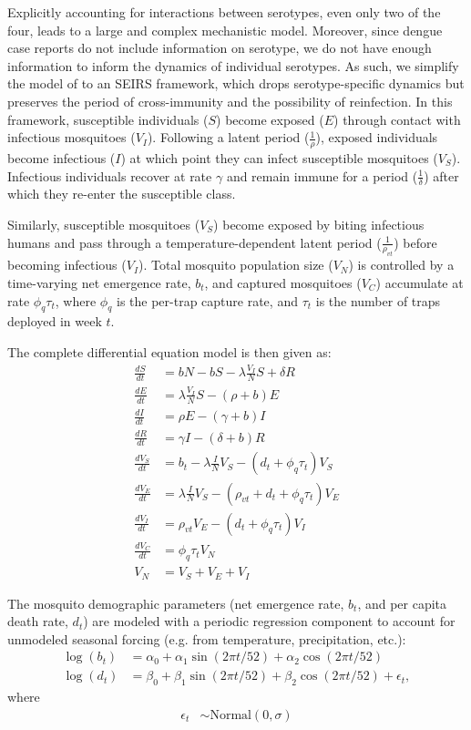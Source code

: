 \documentclass[10pt,letterpaper]{article}
\begin{document}
Explicitly accounting for interactions between serotypes, even only two of the four, leads to a large and complex mechanistic model.
Moreover, since dengue case reports do not include information on serotype, we do not have enough information to inform the dynamics of individual serotypes.
As such, we simplify the model of \cite{Wearing2006} to an SEIRS framework, which drops serotype-specific dynamics but preserves the period of cross-immunity and the possibility of reinfection.
In this framework, susceptible individuals ($S$) become exposed ($E$) through contact with infectious mosquitoes ($V_I$).
Following a latent period ($\frac{1}{\rho}$), exposed individuals become infectious ($I$) at which point they can infect susceptible mosquitoes ($V_S$).
Infectious individuals recover at rate $\gamma$ and remain immune for a period ($\frac{1}{\delta}$) after which they re-enter the susceptible class.

Similarly, susceptible mosquitoes ($V_S$) become exposed by biting infectious humans and pass through a temperature-dependent latent period ($\frac{1}{\rho_{vt}}$) before becoming infectious ($V_I$).
Total mosquito population size ($V_N$) is controlled by a time-varying net emergence rate, $b_t$, and captured mosquitoes ($V_C$) accumulate at rate $\phi_q \tau_t$, where $\phi_q$ is the per-trap capture rate, and $\tau_t$ is the number of traps deployed in week $t$.

The complete differential equation model is then given as:
\begin{align} 
\frac{dS}{dt} &= bN - bS - \lambda \frac{V_{I}}{N} S + \delta R\\
\frac{dE}{dt} &= \lambda \frac{V_{I}}{N} S - (\rho + b)E\\
\frac{dI}{dt} &= \rho E - (\gamma + b)I\\
\frac{dR}{dt} &= \gamma I - (\delta + b)R\\
\frac{dV_S}{dt} & = b_t - \lambda \frac{I}{N} V_S - (d_t + \phi_q \tau_t) V_S \\
\frac{dV_E}{dt} &= \lambda \frac{I}{N} V_S - (\rho_{vt} + d_t + \phi_q \tau_t)V_E\\
\frac{dV_I}{dt} &= \rho_{vt} V_E - (d_t + \phi_q \tau_t) V_I\\
\frac{dV_C}{dt} & = \phi_q \tau_t V_N\\
V_N &= V_S + V_E + V_I
\end{align}

The mosquito demographic parameters (net emergence rate, $b_t$, and per capita death rate, $d_t$) are modeled with a periodic regression component to account for unmodeled seasonal forcing (e.g. from temperature, precipitation, etc.):
\begin{align}
\log(b_t) & = \alpha_{0} + \alpha_1 \sin(2\pi t / 52) + \alpha_2 \cos(2\pi t / 52) \\
\log(d_{t}) & = \beta_{0} + \beta_1 \sin(2\pi t / 52) + \beta_2 \cos(2\pi t / 52) + \epsilon_t,
\end{align}
where
\begin{align}
\epsilon_t & \sim \text{Normal}(0, \sigma)\\
\end{align}
\end{document}
